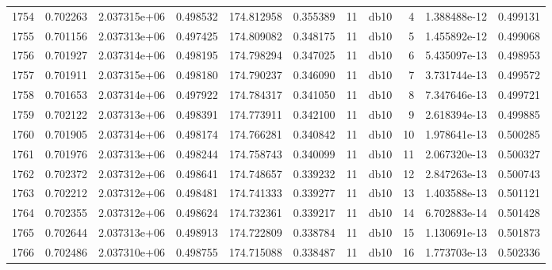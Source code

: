 \begin{tabular}{lrrrrrrlrrr}
1754 &    0.702263 &        2.037315e+06 &  0.498532 &              174.812958 &    0.355389 &      11 &         db10 &      4 &   1.388488e-12 &      0.499131 \\
1755 &    0.701156 &        2.037313e+06 &  0.497425 &              174.809082 &    0.348175 &      11 &         db10 &      5 &   1.455892e-12 &      0.499068 \\
1756 &    0.701927 &        2.037314e+06 &  0.498195 &              174.798294 &    0.347025 &      11 &         db10 &      6 &   5.435097e-13 &      0.498953 \\
1757 &    0.701911 &        2.037315e+06 &  0.498180 &              174.790237 &    0.346090 &      11 &         db10 &      7 &   3.731744e-13 &      0.499572 \\
1758 &    0.701653 &        2.037314e+06 &  0.497922 &              174.784317 &    0.341050 &      11 &         db10 &      8 &   7.347646e-13 &      0.499721 \\
1759 &    0.702122 &        2.037313e+06 &  0.498391 &              174.773911 &    0.342100 &      11 &         db10 &      9 &   2.618394e-13 &      0.499885 \\
1760 &    0.701905 &        2.037314e+06 &  0.498174 &              174.766281 &    0.340842 &      11 &         db10 &     10 &   1.978641e-13 &      0.500285 \\
1761 &    0.701976 &        2.037313e+06 &  0.498244 &              174.758743 &    0.340099 &      11 &         db10 &     11 &   2.067320e-13 &      0.500327 \\
1762 &    0.702372 &        2.037312e+06 &  0.498641 &              174.748657 &    0.339232 &      11 &         db10 &     12 &   2.847263e-13 &      0.500743 \\
1763 &    0.702212 &        2.037312e+06 &  0.498481 &              174.741333 &    0.339277 &      11 &         db10 &     13 &   1.403588e-13 &      0.501121 \\
1764 &    0.702355 &        2.037312e+06 &  0.498624 &              174.732361 &    0.339217 &      11 &         db10 &     14 &   6.702883e-14 &      0.501428 \\
1765 &    0.702644 &        2.037313e+06 &  0.498913 &              174.722809 &    0.338784 &      11 &         db10 &     15 &   1.130691e-13 &      0.501873 \\
1766 &    0.702486 &        2.037310e+06 &  0.498755 &              174.715088 &    0.338487 &      11 &         db10 &     16 &   1.773703e-13 &      0.502336 \\

\end{tabular}
